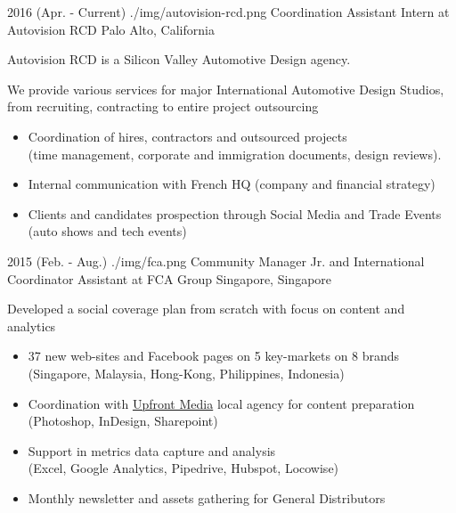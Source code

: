 \documentclass[]{cv}
\begin{document}
\begin{entrylistlogodated}

\entrylogodated
       {2016 \scriptsize{(Apr. - Current)}}
       {./img/autovision-rcd.png}
       {Coordination Assistant Intern at Autovision RCD}
       {Palo Alto, California}
       {
         Autovision RCD is a Silicon Valley Automotive Design agency.

         We provide various services for major International
         Automotive Design Studios, from recruiting, contracting to
         entire project outsourcing

         \begin{itemize}
         \item Coordination of hires, contractors and outsourced
           projects\\ 
           (time management, corporate and immigration documents,
           design reviews).
         \item Internal communication with French HQ (company and
           financial strategy)
         \item Clients and candidates prospection through Social Media
           and Trade Events (auto shows and tech events)
         \end{itemize}
       }
\end{entrylistlogodated}

\begin{entrylistlogodated}
\entrylogodated
       {2015 \scriptsize{(Feb. - Aug.)}}
       {./img/fca.png}
       {Community Manager Jr. and International Coordinator Assistant at FCA Group}
       {Singapore, Singapore}
       {
         Developed a social coverage plan from scratch with focus on content and analytics
         \begin{itemize}
         \item 37 new web-sites and Facebook pages on 5 key-markets on 8 brands\\
           (Singapore, Malaysia, Hong-Kong, Philippines, Indonesia)
        \item Coordination with \href{http://upfront-asia.upfrontmedia.asia}{Upfront Media} local agency for content preparation\\
          (Photoshop, InDesign, Sharepoint)
         \item Support in metrics data capture and analysis\\
           (Excel, Google Analytics, Pipedrive, Hubspot, Locowise)
         \item Monthly newsletter and assets gathering for General Distributors
         \end{itemize}
       }
\end{entrylistlogodated}
\end{document}
